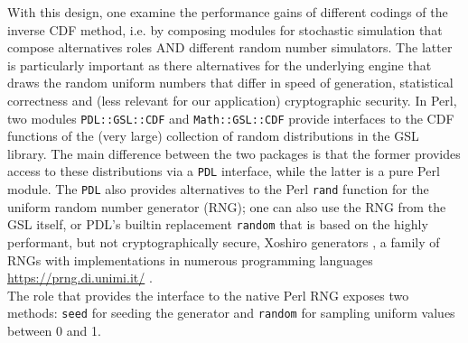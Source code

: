 \documentclass[10pt]{article}
\begin{document}
With this design, one examine the performance gains of different codings of the inverse CDF method, i.e. by composing modules for stochastic simulation that compose alternatives roles AND different random number simulators. The latter is particularly important as there alternatives for the underlying engine that draws the random uniform numbers 
that differ in speed of generation, statistical correctness and (less relevant for our application) cryptographic security. In Perl, two modules \texttt{PDL::GSL::CDF} and \texttt{Math::GSL::CDF} provide interfaces to the CDF functions of the (very large) collection of random distributions in the GSL library. The main difference between the two packages is that the former provides access to these distributions via a \texttt{PDL} interface, while the latter is a pure Perl module. The \texttt{PDL} also provides alternatives to the Perl \texttt{rand} function for the uniform random number generator (RNG); one can also use the RNG from the GSL itself, or PDL's builtin replacement \texttt{random} that is based on the highly performant, but not cryptographically secure, Xoshiro generators \cite{blackman_scrambled_2021}, a family of RNGs with implementations in numerous programming languages \url{https://prng.di.unimi.it/} . \\
The role  that provides the interface to the native Perl RNG exposes two methods: \texttt{seed} for seeding the generator and \texttt{random} for sampling uniform values between 0 and 1.
\end{document}
